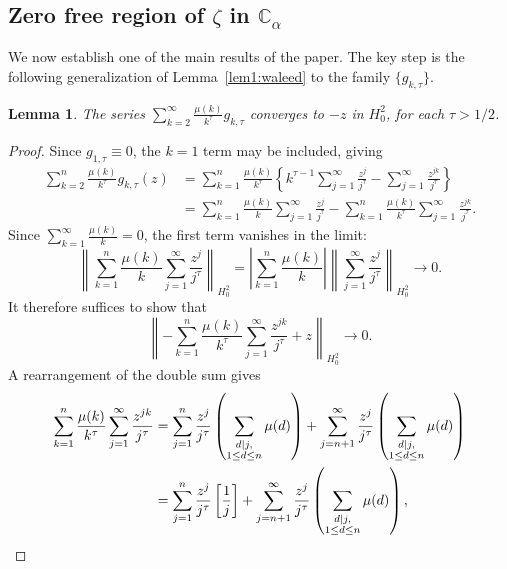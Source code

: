 \documentclass[11pt]{extarticle}
\numberwithin{equation}{section}
\theoremstyle{plain}
\newtheorem{lemma}{Lemma}[section]
\theoremstyle{definition}
\begin{document}
\subsection{Zero free region of $\zeta$ in $\mathbb{C}_\alpha$}

We now establish one of the main results of the paper. The key step is the following 
generalization of Lemma~\ref{lem1:waleed} to the family $\{g_{k,\tau}\}$.

\begin{lemma}\label{lem:main}
The series $\sum_{k=2}^{\infty} \frac{\mu(k)}{k^\tau} g_{k,\tau}$ converges 
to $-z$ in $H^2_0$, for each $\tau > 1/2$.
\end{lemma}

\begin{proof}
Since $g_{1,\tau}\equiv 0$, the $k=1$ term may be included, giving
\begin{align*}
\sum_{k=2}^{n} \frac{\mu(k)}{k^\tau} g_{k,\tau}(z)
&= \sum_{k=1}^{n} \frac{\mu(k)}{k^\tau} \left\{ k^{\tau-1}\sum_{j=1}^{\infty} \frac{z^j}{j^\tau} - \sum_{j=1}^{\infty}\frac{z^{jk}}{j^\tau} \right\}\\
&= \sum_{k=1}^{n} \frac{\mu(k)}{k} \sum_{j=1}^{\infty} \frac{z^j}{j^\tau} - \sum_{k=1}^{n} \frac{\mu(k)}{k^\tau} \sum_{j=1}^{\infty}\frac{z^{jk}}{j^\tau}.
\end{align*}
Since $\sum_{k=1}^{\infty} \frac{\mu(k)}{k} = 0$, the first term vanishes in the limit:
\[
\left\|\sum_{k=1}^{n} \frac{\mu(k)}{k} \sum_{j=1}^{\infty} \frac{z^j}{j^\tau}\right\|_{H^2_0} 
= \left|\sum_{k=1}^{n} \frac{\mu(k)}{k}\right| \left\|\sum_{j=1}^{\infty} \frac{z^j}{j^\tau}\right\|_{H^2_0} \longrightarrow 0.
\]
It therefore suffices to show that
\begin{equation}\label{eq:suffices}
\left\| -\sum_{k=1}^{n} \frac{\mu(k)}{k^\tau} \sum_{j=1}^{\infty}\frac{z^{jk}}{j^\tau} + z \right\|_{H^2_0} \longrightarrow 0.
\end{equation}
A rearrangement of the double sum gives
\begin{align}
\sum_{k=1}^{n} \frac{\mu(k)}{k^\tau} \sum_{j=1}^{\infty}\frac{z^{jk}}{j^\tau}
&= \sum_{j=1}^{n} \frac{z^j}{j^\tau}\left(\sum_{\substack{d|j,\\ 1\leq d\leq n}}\mu(d)\right) + \sum_{j=n+1}^{\infty} \frac{z^j}{j^\tau}\left(\sum_{\substack{d|j,\\ 1\leq d\leq n}}\mu(d)\right)\notag\\
&= \sum_{j=1}^{n} \frac{z^j}{j^\tau}\left[\frac{1}{j}\right] + \sum_{j=n+1}^{\infty} \frac{z^j}{j^\tau}\left(\sum_{\substack{d|j,\\ 1\leq d\leq n}}\mu(d)\right), \label{eq:rearrange}

\end{align}
\end{proof}
\end{document}
